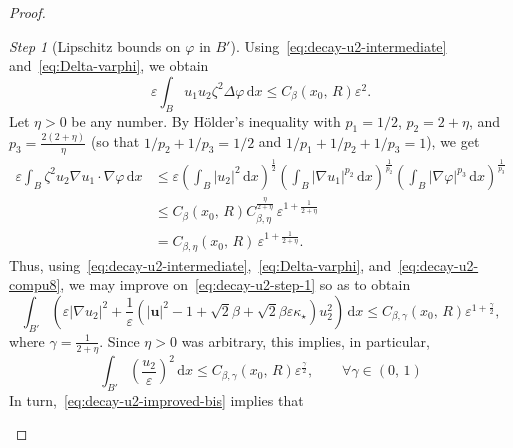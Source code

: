 \documentclass[a4paper, 11pt, twoside, leqno]{article}
\theoremstyle{definition}              %
\theoremstyle{remark}                  %
\newtheorem{step}{Step}
\newcommand{\abs}[1]{\left| #1 \right|}                             %
\renewcommand{\d}{\mathrm{d}}
\renewcommand{\u}{\mathbf{u}}
\newcommand{\eps}{\varepsilon}
\begin{document}
\begin{proof}
\begin{step}[Lipschitz bounds on $\varphi$ in $B'$]\label{step:Lip-bounds-phi}
    Using~\eqref{eq:decay-u2-intermediate} and~\eqref{eq:Delta-varphi}, we obtain
    \begin{equation}\label{eq:decay-u2-compu8}
       \eps \int_B u_1 u_2 \zeta^2 \Delta   \varphi \,{\d}x \leq C_\beta(x_0,\,R) \eps^2.
    \end{equation}
    Let $\eta > 0$ be any number. 
    By H\"{o}lder's inequality with $p_1 = 1/2$, $p_2 = 2 + \eta$, 
    and $p_3 = \frac{2(2+\eta)}{\eta}$ (so that $1/p_2 + 1/p_3 = 1/2$ and $1/p_1 + 1/p_2 + 1/p_3 = 1$), 
    we get
    \begin{equation}\label{eq:decay-u2-compu9}
    \begin{split}
        \eps \int_B \zeta^2 u_2 \nabla u_1 \cdot \nabla \varphi \,{\d}x 
        &\leq \eps \left( \int_B \abs{u_2}^2 \,{\d}x \right)^{\frac{1}{2}} \left( \int_B \abs{\nabla u_1}^{p_2} \,{\d}x \right)^{\frac{1}{p_2}} \left( \int_B \abs{\nabla \varphi}^{p_3} \,{\d}x \right)^{\frac{1}{p_3}} \\
        &\leq C_\beta(x_0,\,R) C_{\beta,\eta}^{\frac{\eta}{2+\eta}} \,\eps^{1 + \frac{1}{2 +\eta}} \\
        &= C_{\beta,\eta}(x_0,\,R) \, \eps^{1+\frac{1}{2+\eta}}.
    \end{split}
    \end{equation}
    Thus, using~\eqref{eq:decay-u2-intermediate},~\eqref{eq:Delta-varphi}, 
    and~\eqref{eq:decay-u2-compu8}, we may improve on~\eqref{eq:decay-u2-step-1} so as to obtain
    \begin{equation}\label{eq:decay-u2-improved}
        \int_{B'}\left( \eps \abs{\nabla u_2}^2 + \frac{1}{\eps}\left( \abs{\u}^2 - 1 + \sqrt{2}\beta + \sqrt{2}\beta \eps \kappa_\star \right)u_2^2\right)\,{\d}x \leq C_{\beta,\gamma}(x_0,\,R) \eps^{1+\frac{\gamma}{2}}, 
    \end{equation}
    where $\gamma = \frac{1}{2+\eta}$. Since $\eta > 0$ was arbitrary, 
    this implies, in particular,
    \begin{equation}\label{eq:decay-u2-improved-bis}
        \int_{B'} \left( \frac{u_2}{\eps} \right)^2 \,{\d}x 
        \leq C_{\beta,\gamma}(x_0,\,R) \eps^{\frac{\gamma}{2}}, 
        \qquad \forall \gamma \in (0,\,1)
    \end{equation}
    In turn,~\eqref{eq:decay-u2-improved-bis} implies that
    \begin{equation}\label{eq:decay-L2-norm-geps}

\end{equation}
\end{step}
\end{proof}
\end{document}
